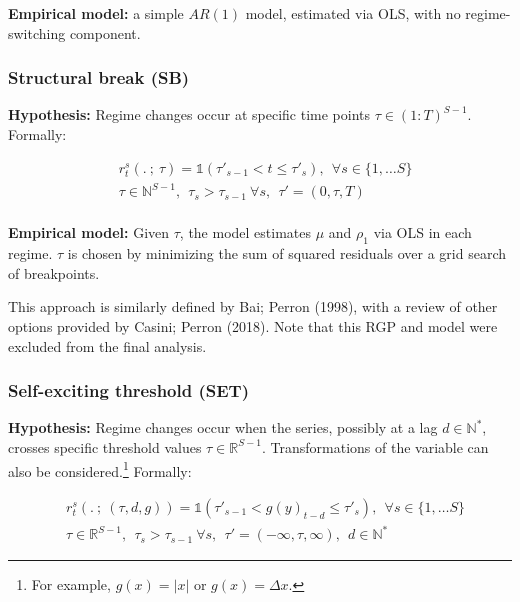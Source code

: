 \documentclass[
  letterpaper,
  DIV=11,
  numbers=noendperiod]{scrartcl}
\numberwithin{equation}{section}
\numberwithin{table}{section}
\numberwithin{figure}{section}
\begin{document}
\textbf{Empirical model:} a simple \(AR(1)\) model, estimated via OLS,
with no regime-switching component.

\subsubsection{Structural break (SB)}\label{structural-break-sb}

\textbf{Hypothesis:} Regime changes occur at specific time points
\(\tau \in (1:T)^{S-1}\). Formally:

\begin{equation}
\begin{array}{ll}
    &r^s_t(. ~;~ \tau) = \mathbb{1}(\tau'_{s-1} < t \leq \tau'_s), ~~ \forall s \in \{1, \dots S\}\\
    &\tau \in \mathbb{N}^{S-1}, ~~ \tau_{s} > \tau_{s-1} ~\forall s, ~~ \tau' = (0, \tau, T)\\
\end{array}
\end{equation}

\textbf{Empirical model:} Given \(\tau\), the model estimates \(\mu\)
and \(\rho_1\) via OLS in each regime. \(\tau\) is chosen by minimizing
the sum of squared residuals over a grid search of breakpoints.

This approach is similarly defined by Bai; Perron (1998), with a review
of other options provided by Casini; Perron (2018). Note that this RGP
and model were excluded from the final analysis.

\subsubsection{Self-exciting threshold
(SET)}\label{self-exciting-threshold-set}

\textbf{Hypothesis:} Regime changes occur when the series, possibly at a
lag \(d \in \mathbb{N}^*\), crosses specific threshold values
\(\tau \in \mathbb{R}^{S-1}\). Transformations of the variable can also
be considered.\footnote{For example, \(g(x) = |x|\) or
  \(g(x) = \Delta x\).} Formally:

\begin{equation}
\begin{array}{ll}
    &r^s_t(. ~;~ (\tau, d, g)) = \mathbb{1}(\tau'_{s-1} < g(y)_{t-d} \leq \tau'_s), ~~ \forall s \in \{1, \dots S\}\\
    &\tau \in \mathbb{R}^{S-1}, ~~ \tau_{s} > \tau_{s-1} ~\forall s, ~~ \tau' = (-\infty, \tau, \infty), ~~ d \in \mathbb{N}^*
\end{array}
\end{equation}
\end{document}
